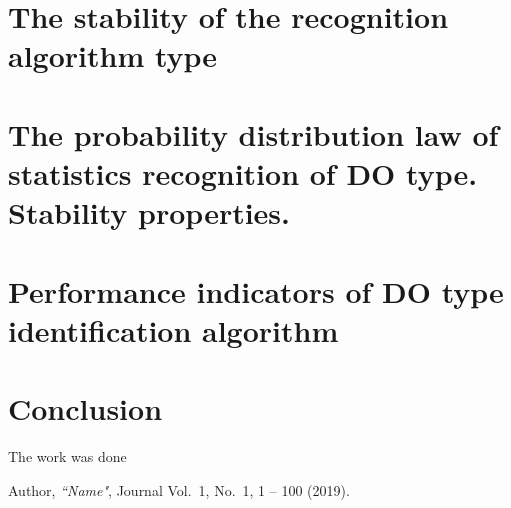 \documentclass[
11pt,%
tightenlines,%
twoside,%
onecolumn,%
nofloats,%
nobibnotes,%
nofootinbib,%
superscriptaddress,%
noshowpacs,%
centertags]%
{revtex4}
\begin{document}


\section{The stability of the recognition algorithm type}



\section{The probability distribution law of statistics recognition of DO type. Stability properties.}



\section{Performance indicators of DO type identification algorithm}



\section{Conclusion}



\begin{acknowledgments}
The work was done
\end{acknowledgments}

\begin{thebibliography}{99}

Author, {\it ``Name"}, Journal Vol.~1, No.~1, 1 -- 100 (2019).

\end{thebibliography}
\end{document}
